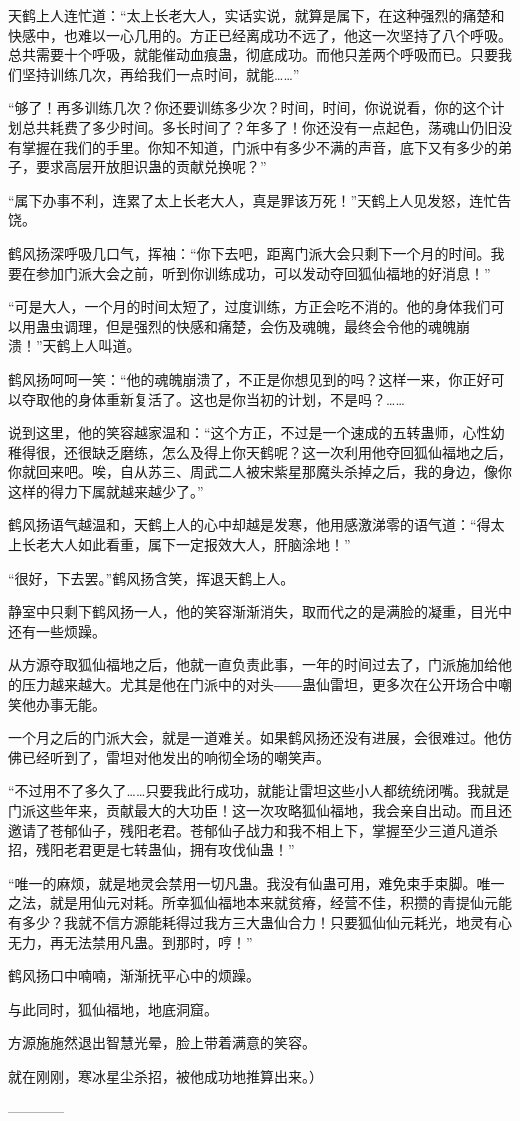 \begin{this_body}
天鹤上人连忙道：“太上长老大人，实话实说，就算是属下，在这种强烈的痛楚和快感中，也难以一心几用的。方正已经离成功不远了，他这一次坚持了八个呼吸。总共需要十个呼吸，就能催动血痕蛊，彻底成功。而他只差两个呼吸而已。只要我们坚持训练几次，再给我们一点时间，就能……”

“够了！再多训练几次？你还要训练多少次？时间，时间，你说说看，你的这个计划总共耗费了多少时间。多长时间了？年多了！你还没有一点起色，荡魂山仍旧没有掌握在我们的手里。你知不知道，门派中有多少不满的声音，底下又有多少的弟子，要求高层开放胆识蛊的贡献兑换呢？”

“属下办事不利，连累了太上长老大人，真是罪该万死！”天鹤上人见发怒，连忙告饶。

鹤风扬深呼吸几口气，挥袖：“你下去吧，距离门派大会只剩下一个月的时间。我要在参加门派大会之前，听到你训练成功，可以发动夺回狐仙福地的好消息！”

“可是大人，一个月的时间太短了，过度训练，方正会吃不消的。他的身体我们可以用蛊虫调理，但是强烈的快感和痛楚，会伤及魂魄，最终会令他的魂魄崩溃！”天鹤上人叫道。

鹤风扬呵呵一笑：“他的魂魄崩溃了，不正是你想见到的吗？这样一来，你正好可以夺取他的身体重新复活了。这也是你当初的计划，不是吗？……

说到这里，他的笑容越家温和：“这个方正，不过是一个速成的五转蛊师，心性幼稚得很，还很缺乏磨练，怎么及得上你天鹤呢？这一次利用他夺回狐仙福地之后，你就回来吧。唉，自从苏三、周武二人被宋紫星那魔头杀掉之后，我的身边，像你这样的得力下属就越来越少了。”

鹤风扬语气越温和，天鹤上人的心中却越是发寒，他用感激涕零的语气道：“得太上长老大人如此看重，属下一定报效大人，肝脑涂地！”

“很好，下去罢。”鹤风扬含笑，挥退天鹤上人。

静室中只剩下鹤风扬一人，他的笑容渐渐消失，取而代之的是满脸的凝重，目光中还有一些烦躁。

从方源夺取狐仙福地之后，他就一直负责此事，一年的时间过去了，门派施加给他的压力越来越大。尤其是他在门派中的对头――蛊仙雷坦，更多次在公开场合中嘲笑他办事无能。

一个月之后的门派大会，就是一道难关。如果鹤风扬还没有进展，会很难过。他仿佛已经听到了，雷坦对他发出的响彻全场的嘲笑声。

“不过用不了多久了……只要我此行成功，就能让雷坦这些小人都统统闭嘴。我就是门派这些年来，贡献最大的大功臣！这一次攻略狐仙福地，我会亲自出动。而且还邀请了苍郁仙子，残阳老君。苍郁仙子战力和我不相上下，掌握至少三道凡道杀招，残阳老君更是七转蛊仙，拥有攻伐仙蛊！”

“唯一的麻烦，就是地灵会禁用一切凡蛊。我没有仙蛊可用，难免束手束脚。唯一之法，就是用仙元对耗。所幸狐仙福地本来就贫瘠，经营不佳，积攒的青提仙元能有多少？我就不信方源能耗得过我方三大蛊仙合力！只要狐仙仙元耗光，地灵有心无力，再无法禁用凡蛊。到那时，哼！”

鹤风扬口中喃喃，渐渐抚平心中的烦躁。

与此同时，狐仙福地，地底洞窟。

方源施施然退出智慧光晕，脸上带着满意的笑容。

就在刚刚，寒冰星尘杀招，被他成功地推算出来。）

------------

\end{this_body}


